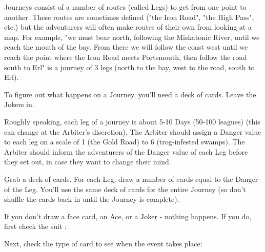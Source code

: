 {\begin{multicols}{2}

Journeys consist of a number of routes (called Legs) to get from one point to another.  These routes are sometimes defined ("the Iron Road", "the High Pass", etc.) but the adventurers will often make routes of their own from looking at a map.  For example, "we must bear north, following the Miskatonic River, until we reach the mouth of the bay.  From there we will follow the coast west until we reach the point where the Iron Road meets Portsmouth, then follow the road south to Erl" is a journey of 3 legs (north to the bay, west to the road, south to Erl).

To figure out what happens on a Journey, you'll need a deck of cards.  Leave the Jokers in.

Roughly speaking, each leg of a journey is about 5-10 Days (50-100 leagues) (this can change at the Arbiter's discretion).  The Arbiter should assign a Danger value to each leg on a scale of 1 (the Gold Road) to 6 (trog-infested swamps).  The Arbiter should inform the adventurers of the Danger value of each Leg before they set out, in case they want to change their mind.

Grab a deck of cards.  For each Leg, draw a number of cards equal to the Danger of the Leg.  You'll use the same deck of cards for the entire Journey (so don't shuffle the cards back in until the Journey is complete).

If you don't draw a face card, an Ace, or a Joker - nothing happens.  If you do, first check the suit :


  Next, check the type of card to see when the event takes place:





\end{multicols}}
